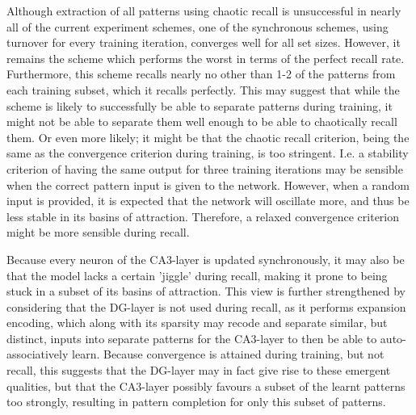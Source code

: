Although extraction of all patterns using chaotic recall is unsuccessful in nearly all of the current experiment schemes, one of the synchronous schemes, using turnover for every training iteration, converges well for all set sizes. However, it remains the scheme which performs the worst in terms of the perfect recall rate.
Furthermore, this scheme recalls nearly no other than 1-2 of the patterns from each training subset, which it recalls perfectly. 
This may suggest that while the scheme is likely to successfully be able to separate patterns during training, it might not be able to separate them well enough to be able to chaotically recall them. Or even more likely; it might be that the chaotic recall criterion, being the same as the convergence criterion during training, is too stringent. I.e. a stability criterion of having the same output for three training iterations may be sensible when the correct pattern input is given to the network. However, when a random input is provided, it is expected that the network will oscillate more, and thus be less stable in its basins of attraction. Therefore, a relaxed convergence criterion might be more sensible during recall.

Because every neuron of the CA3-layer is updated synchronously, it may also be that the model lacks a certain 'jiggle' during recall, making it prone to being stuck in a subset of its basins of attraction. This view is further strengthened by considering that the DG-layer is not used during recall, as it performs expansion encoding, which along with its sparsity may recode and separate similar, but distinct, inputs into separate patterns for the CA3-layer to then be able to auto-associatively learn. Because convergence is attained during training, but not recall, this suggests that the DG-layer may in fact give rise to these emergent qualities, but that the CA3-layer possibly favours a subset of the learnt patterns too strongly, resulting in pattern completion for only this subset of patterns.

